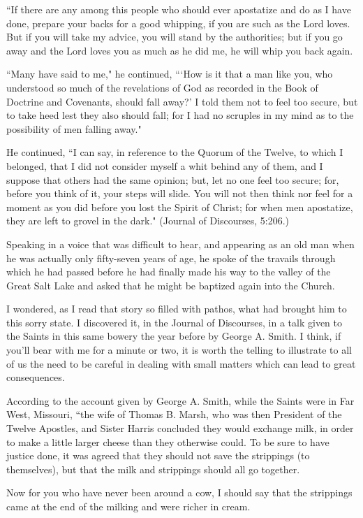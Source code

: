 ``If there are any among this people who should ever apostatize and do as I have done, prepare your backs for a good whipping, if you are such as the Lord loves. But if you will take my advice, you will stand by the authorities; but if you go away and the Lord loves you as much as he did me, he will whip you back again.

``Many have said to me," he continued, ```How is it that a man like you, who understood so much of the revelations of God as recorded in the Book of Doctrine and Covenants, should fall away?’ I told them not to feel too secure, but to take heed lest they also should fall; for I had no scruples in my mind as to the possibility of men falling away."

He continued, ``I can say, in reference to the Quorum of the Twelve, to which I belonged, that I did not consider myself a whit behind any of them, and I suppose that others had the same opinion; but, let no one feel too secure; for, before you think of it, your steps will slide. You will not then think nor feel for a moment as you did before you lost the Spirit of Christ; for when men apostatize, they are left to grovel in the dark." (Journal of Discourses, 5:206.)

Speaking in a voice that was difficult to hear, and appearing as an old man when he was actually only fifty-seven years of age, he spoke of the travails through which he had passed before he had finally made his way to the valley of the Great Salt Lake and asked that he might be baptized again into the Church.

I wondered, as I read that story so filled with pathos, what had brought him to this sorry state. I discovered it, in the Journal of Discourses, in a talk given to the Saints in this same bowery the year before by George A. Smith. I think, if you’ll bear with me for a minute or two, it is worth the telling to illustrate to all of us the need to be careful in dealing with small matters which can lead to great consequences.

According to the account given by George A. Smith, while the Saints were in Far West, Missouri, ``the wife of Thomas B. Marsh, who was then President of the Twelve Apostles, and Sister Harris concluded they would exchange milk, in order to make a little larger cheese than they otherwise could. To be sure to have justice done, it was agreed that they should not save the strippings (to themselves), but that the milk and strippings should all go together.

Now for you who have never been around a cow, I should say that the strippings came at the end of the milking and were richer in cream.

